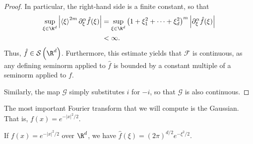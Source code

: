 \documentclass[10pt]{mypackage}
\begin{document}
\begin{proof}
  In particular, the right-hand side is a finite constant, so that
  \begin{align*}
    \sup_{\xi\in \R^{d}}\left\vert \left\langle \xi \right\rangle^{2m} \partial^{\alpha}_{\xi}\hat{f}(\xi) \right\vert &= \sup_{\xi\in \R^{d}}\left( 1 + \xi_1^2 + \cdots + \xi_d^2\right)^{m} \left\vert \partial^{\alpha}_{\xi} \hat{f}(\xi) \right\vert\\
                                                      &< \infty.
  \end{align*}
  Thus, $\hat{f}\in \mathcal{S}\left( \R^d \right)$. Furthermore, this estimate yields that $\mathcal{F}$ is continuous, as any defining seminorm applied to $\hat{f}$ is bounded by a constant multiple of a seminorm applied to $f$.

  Similarly, the map $ \mathcal{G} $ simply substitutes $i$ for $-i$, so that $\mathcal{G}$ is also continuous.
\end{proof}
The most important Fourier transform that we will compute is the Gaussian. That is, $f(x) = e^{-\left\vert x \right\vert^2/2}$.
\begin{theorem}
  If $f(x) = e^{-\left\vert x \right\vert^2/2}$ over $\R^d$, we have $\hat{f}(\xi) = \left( 2\pi \right)^{d/2}e^{-\xi^2/2}$.
\end{theorem}
\end{document}
